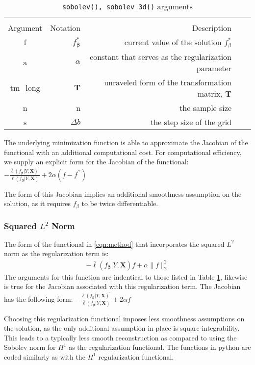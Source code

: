 \documentclass[a4paper,12pt]{article}
\newcommand{\bbeta}{{\boldsymbol{\beta}}}
\newcommand{\bX}{\mathbf{X}}
\begin{document}
\begin{table}[!h]
	\caption{\texttt{sobolev(), sobolev\_3d()} arguments}
	\centering 
	\begin{tabular}{c rrrr} 
		\hline\hline \\ [-1.5ex]
		Argument & Notation & Description \\ [0.5ex]
		\hline 
		f & $f_\bbeta^{*}$ & current value of the solution $f_\beta^{*}$ & \\ 
		a & $\alpha$ & constant that serves as the regularization parameter & \\
		tm\_long & $\mathbf{T}$ & unraveled form of the transformation matrix, $\mathbf{T}$ &\\
		n & n & the sample size & \\
		s & $\Delta b$ & the step size of the grid & \\
		\hline %
	\end{tabular}
	\label{tab:sobolev_args}
\end{table}

The underlying minimization function is able to approximate the Jacobian of the functional with an additional computational cost. For computational efficiency, we supply an explicit form for the Jacobian of the functional: $-\frac{\bar{\ell}(f_\bbeta|Y,\bX)^{\prime}}{\bar{\ell}(f_\bbeta|Y,\bX)}+2\alpha (f-f^{\prime\prime})$

The form of this Jacobian implies an additional smoothness assumption on the solution, as it requires $f_\beta$ to be twice differentiable. 

\subsubsection{Squared $L^2$ Norm}

The form of the functional in \eqref{eqn:method} that incorporates the squared $L^2$ norm as the regularization term is:
\begin{align*}
	-\bar{\ell}(f_\bbeta|Y,\bX) f+\alpha\|f\|_{2}^{2}
\end{align*}
The arguments for this function are indentical to those listed in Table \ref{tab:sobolev_args}, likewise is true for the Jacobian associated with this regularization term. The Jacobian has the following form: $-\frac{\bar{\ell}(f_\bbeta|Y,\bX)^{\prime}}{\bar{\ell}(f_\bbeta|Y,\bX)}+2\alpha f$

Choosing this regularization functional imposes less smoothness assumptions on the solution, as the only additional assumption in place is square-integrability. This leads to a typically less smooth reconstruction as compared to using the Sobolev norm for $H^1$ as the regularization functional. The functions in python are coded similarly as with the $H^1$ regularization functional.
\end{document}
